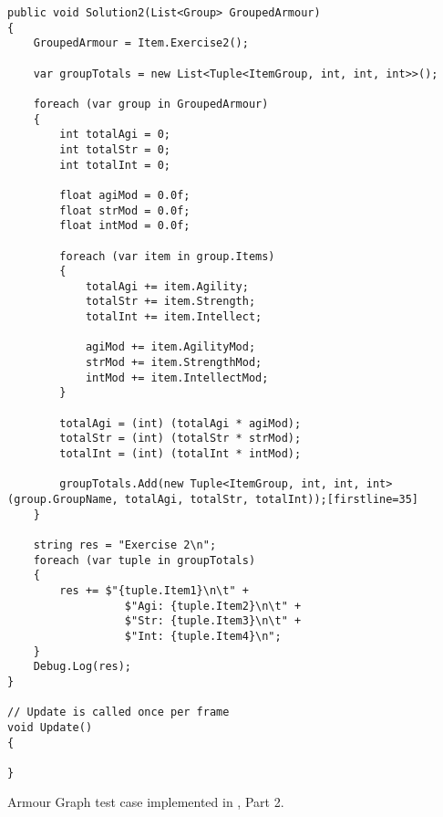 \begin{listing}[H]
\begin{verbatim}
public void Solution2(List<Group> GroupedArmour)
{
    GroupedArmour = Item.Exercise2();

    var groupTotals = new List<Tuple<ItemGroup, int, int, int>>();

    foreach (var group in GroupedArmour)
    {
        int totalAgi = 0;
        int totalStr = 0;
        int totalInt = 0;

        float agiMod = 0.0f;
        float strMod = 0.0f;
        float intMod = 0.0f;

        foreach (var item in group.Items)
        {
            totalAgi += item.Agility;
            totalStr += item.Strength;
            totalInt += item.Intellect;

            agiMod += item.AgilityMod;
            strMod += item.StrengthMod;
            intMod += item.IntellectMod;
        }

        totalAgi = (int) (totalAgi * agiMod);
        totalStr = (int) (totalStr * strMod);
        totalInt = (int) (totalInt * intMod);

        groupTotals.Add(new Tuple<ItemGroup, int, int, int>(group.GroupName, totalAgi, totalStr, totalInt));[firstline=35]
    }

    string res = "Exercise 2\n";
    foreach (var tuple in groupTotals)
    {
        res += $"{tuple.Item1}\n\t" +
                  $"Agi: {tuple.Item2}\n\t" +
                  $"Str: {tuple.Item3}\n\t" +
                  $"Int: {tuple.Item4}\n";
    }
    Debug.Log(res);
}

// Update is called once per frame
void Update()
{

}
\end{verbatim}
\caption{Armour Graph test case implemented in \cs, Part 2.}
\label{lst:armour-graph-cs-2}
\end{listing}

